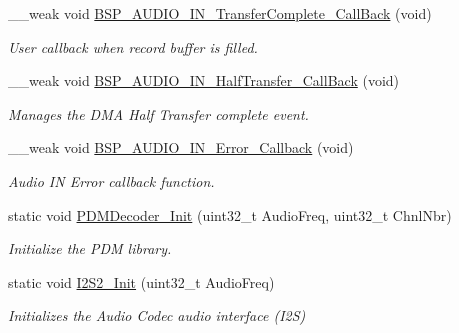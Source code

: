 \begin{DoxyCompactItemize}
\+\_\+\+\_\+weak void \mbox{\hyperlink{group___s_t_m32_f4___d_i_s_c_o_v_e_r_y___a_u_d_i_o___i_n___private___functions_ga345932dd9f27ba5e7fbf54fe6e9a18d3}{B\+S\+P\+\_\+\+A\+U\+D\+I\+O\+\_\+\+I\+N\+\_\+\+Transfer\+Complete\+\_\+\+Call\+Back}} (void)
\begin{DoxyCompactList}\small\item\em User callback when record buffer is filled. \end{DoxyCompactList}\item 
\mbox{\label{group___s_t_m32_f4___d_i_s_c_o_v_e_r_y___a_u_d_i_o___i_n___private___functions_ga58049b7f6b2a1f47c114788a932ca1f7}} 
\+\_\+\+\_\+weak void \mbox{\hyperlink{group___s_t_m32_f4___d_i_s_c_o_v_e_r_y___a_u_d_i_o___i_n___private___functions_ga58049b7f6b2a1f47c114788a932ca1f7}{B\+S\+P\+\_\+\+A\+U\+D\+I\+O\+\_\+\+I\+N\+\_\+\+Half\+Transfer\+\_\+\+Call\+Back}} (void)
\begin{DoxyCompactList}\small\item\em Manages the D\+MA Half Transfer complete event. \end{DoxyCompactList}\item 
\mbox{\label{group___s_t_m32_f4___d_i_s_c_o_v_e_r_y___a_u_d_i_o___i_n___private___functions_gaffd34f15e16f10cbe6e4f6fd35cd0ea1}} 
\+\_\+\+\_\+weak void \mbox{\hyperlink{group___s_t_m32_f4___d_i_s_c_o_v_e_r_y___a_u_d_i_o___i_n___private___functions_gaffd34f15e16f10cbe6e4f6fd35cd0ea1}{B\+S\+P\+\_\+\+A\+U\+D\+I\+O\+\_\+\+I\+N\+\_\+\+Error\+\_\+\+Callback}} (void)
\begin{DoxyCompactList}\small\item\em Audio IN Error callback function. \end{DoxyCompactList}\item 
static void \mbox{\hyperlink{group___s_t_m32_f4___d_i_s_c_o_v_e_r_y___a_u_d_i_o___i_n___private___functions_ga4e91ea9d0157bbdd6251f3361ee062bb}{P\+D\+M\+Decoder\+\_\+\+Init}} (uint32\+\_\+t Audio\+Freq, uint32\+\_\+t Chnl\+Nbr)
\begin{DoxyCompactList}\small\item\em Initialize the P\+DM library. \end{DoxyCompactList}\item 
static void \mbox{\hyperlink{group___s_t_m32_f4___d_i_s_c_o_v_e_r_y___a_u_d_i_o___i_n___private___functions_ga47582c41bc5f44468005bfdd6f4545df}{I2\+S2\+\_\+\+Init}} (uint32\+\_\+t Audio\+Freq)
\begin{DoxyCompactList}\small\item\em Initializes the Audio Codec audio interface (I2S) \end{DoxyCompactList}\end{DoxyCompactItemize}


